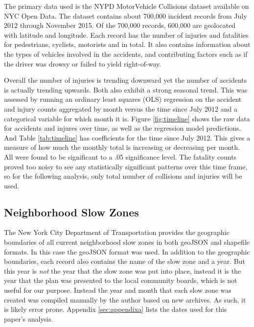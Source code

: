 \documentclass[10pt,journal,compsoc]{IEEEtran}
\begin{document}
The primary data used is the NYPD MotorVehicle Collisions dataset available on NYC Open Data\cite{crashdata}.  The dataset contains about 700,000 incident records from July 2012 through November 2015.  Of the 700,000 records, 600,000 are geolocated with latitude and longitude.  Each record has the number of injuries and fatalities for pedestrians, cyclists, motorists and in total.  It also contains information about the types of vehicles involved in the accidents, and contributing factors such as if the driver was drowsy or failed to yield right-of-way.

Overall the number of injuries is trending downward yet the number of accidents is actually trending upwards. Both also exhibit a strong seasonal trend. This was assessed by running an ordinary least squares (OLS) regression on the accident and injury counts aggregated by month versus the time since July 2012 and a categorical variable for which month it is. Figure \ref{fig:timeline} shows the raw data for accidents and injures over time, as well as the regression model predictions. And Table \ref{tab:timeline} has coefficients for the time since July 2012. This gives a measure of how much the monthly total is increasing or decreasing per month.  All were found to be significant to a .05 significance level.  The fatality counts proved too noisy to see any statistically significant patterns over this time frame, so for the following analysis, only total number of collisions and injuries will be used.



\subsection{Neighborhood Slow Zones}

The New York City Department of Transportation provides the geographic boundaries of all current neighborhood slow zones in both geoJSON and shapefile formats\cite{slowzones}.  In this case the geoJSON format was used.  In addition to the geographic boundaries, each record also contains the name of the slow zone and a year.  But this year is \textit{not} the year that the slow zone was put into place, instead it is the year that the plan was presented to the local community boards, which is not useful for our purpose.  Instead the year and month that each slow zone  was created was compiled manually by the author based on new archives.  As such, it is likely error prone.  Appendix \ref{sec:appendixa} lists the dates used for this paper's analysis.
\end{document}

